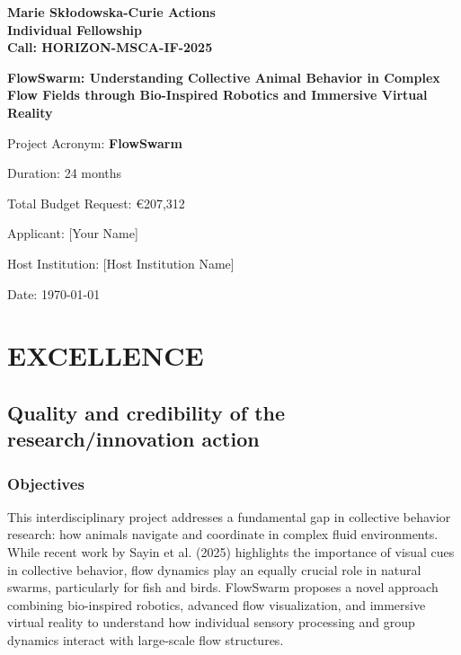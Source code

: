 \documentclass[11pt,a4paper]{article}
\newcommand{\proposaltitle}[1]{\textbf{\Large #1}}
\begin{document}
\begin{titlepage}
\centering
\vspace*{2cm}
{\huge\bfseries Marie Skłodowska-Curie Actions\\Individual Fellowship\\Call: HORIZON-MSCA-IF-2025\par}
\vspace{2cm}
{\Large\proposaltitle{FlowSwarm: Understanding Collective Animal Behavior in Complex Flow Fields through Bio-Inspired Robotics and Immersive Virtual Reality}\par}
\vspace{1.5cm}
{\large Project Acronym: \textbf{FlowSwarm}\par}
\vspace{1cm}
{\large Duration: 24 months\par}
{\large Total Budget Request: €207,312\par}
\vspace{2cm}
{\large Applicant: [Your Name]\par}
{\large Host Institution: [Host Institution Name]\par}
\vspace{2cm}
{\large Date: \today\par}
\vfill
\end{titlepage}

\newpage
\tableofcontents
\newpage

\section{EXCELLENCE}

\subsection{Quality and credibility of the research/innovation action}

\subsubsection{Objectives}

This interdisciplinary project addresses a fundamental gap in collective behavior research: how animals navigate and coordinate in complex fluid environments. While recent work by Sayin et al. (2025)\cite{sayin2025} highlights the importance of visual cues in collective behavior, flow dynamics play an equally crucial role in natural swarms, particularly for fish and birds. FlowSwarm proposes a novel approach combining bio-inspired robotics, advanced flow visualization, and immersive virtual reality to understand how individual sensory processing and group dynamics interact with large-scale flow structures.
\end{document}
